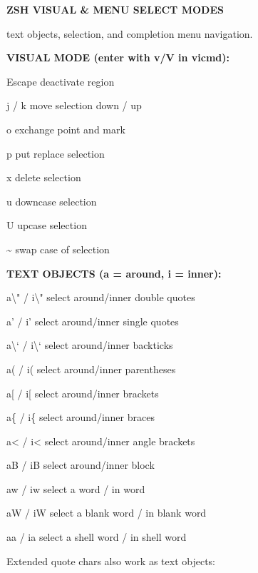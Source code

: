 \documentclass[11pt,a4paper,twoside]{book}
\begin{document}
\vspace{10pt}
{\large\bfseries\color{neoncyan} ZSH VISUAL \& MENU SELECT MODES}\vspace{6pt}

text objects, selection, and completion menu navigation.


\vspace{12pt}
{\bfseries\color{neonyellow} VISUAL MODE (enter with v/V in vicmd):}\vspace{4pt}

Escape                deactivate region

j / k                move selection down / up

o                     exchange point and mark

p                     put replace selection

x                     delete selection

u                     downcase selection

U                     upcase selection

\textasciitilde{}                     swap case of selection


\vspace{12pt}
{\bfseries\color{neonyellow} TEXT OBJECTS (a = around, i = inner):}\vspace{4pt}

a\textbackslash{}" / i\textbackslash{}"              select around/inner double quotes

a' / i'              select around/inner single quotes

a\textbackslash{}` / i\textbackslash{}`              select around/inner backticks

a( / i(              select around/inner parentheses

a[ / i[              select around/inner brackets

a\{ / i\{              select around/inner braces

a< / i<              select around/inner angle brackets

aB / iB              select around/inner block

aw / iw              select a word / in word

aW / iW              select a blank word / in blank word

aa / ia              select a shell word / in shell word

Extended quote chars also work as text objects:
\end{document}
